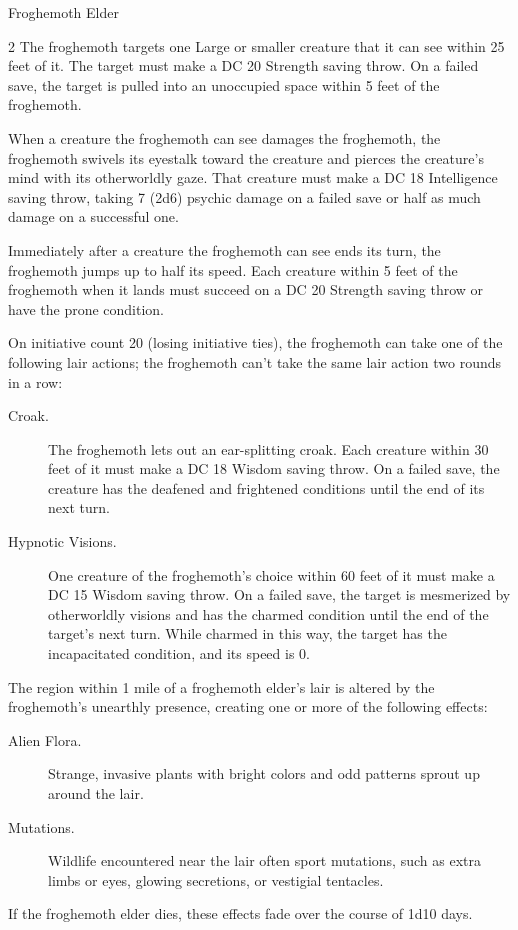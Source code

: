 \documentclass[10pt,a4paper,twoside,bg=print,twocolumn,openany,nodeprecatedcode]{dndbook}
\begin{document}
\begin{DndMonster}[float*=b,width=\textwidth + 8pt]{Froghemoth Elder}
\begin{multicols}{2}
The froghemoth targets one Large or smaller creature that it can see within 25 feet of it. The target must make a DC 20 Strength saving throw. On a failed save, the target is pulled into an unoccupied space within 5 feet of the froghemoth.

When a creature the froghemoth can see damages the froghemoth, the froghemoth swivels its eyestalk toward the creature and pierces the creature's mind with its otherworldly gaze. That creature must make a DC 18 Intelligence saving throw, taking 7 (2d6) psychic damage on a failed save or half as much damage on a successful one.

Immediately after a creature the froghemoth can see ends its turn, the froghemoth jumps up to half its speed. Each creature within 5 feet of the froghemoth when it lands must succeed on a DC 20 Strength saving throw or have the prone condition.

On initiative count 20 (losing initiative ties), the froghemoth can take one of the following lair actions; the froghemoth can't take the same lair action two rounds in a row:


\begin{description}
\item[Croak.]
The froghemoth lets out an ear-splitting croak. Each creature within 30 feet of it must make a DC 18 Wisdom saving throw. On a failed save, the creature has the deafened and frightened conditions until the end of its next turn.
\item[Hypnotic Visions.]
One creature of the froghemoth's choice within 60 feet of it must make a DC 15 Wisdom saving throw. On a failed save, the target is mesmerized by otherworldly visions and has the charmed condition until the end of the target's next turn. While charmed in this way, the target has the incapacitated condition, and its speed is 0.
\end{description}

The region within 1 mile of a froghemoth elder's lair is altered by the froghemoth's unearthly presence, creating one or more of the following effects:


\begin{description}
\item[Alien Flora.]
Strange, invasive plants with bright colors and odd patterns sprout up around the lair.
\item[Mutations.]
Wildlife encountered near the lair often sport mutations, such as extra limbs or eyes, glowing secretions, or vestigial tentacles.
\end{description}

If the froghemoth elder dies, these effects fade over the course of 1d10 days.

\end{multicols}
\end{DndMonster}
\end{document}
